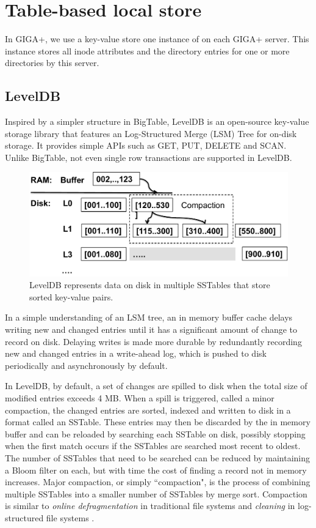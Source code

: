 \section{Table-based local store}
In GIGA+, we use a key-value store 
one instance of \ldb \cite{LevelDB} on each GIGA+ server.
This \ldb instance stores all inode attributes and the directory entries 
for one or more directories by this server.

\subsection{LevelDB}
Inspired by a simpler structure in BigTable\cite{BigTable}, LevelDB \cite{LevelDB} is an open-source key-value storage library
that features an Log-Structured Merge (LSM) Tree \cite{ONeil1996} for on-disk storage.
It provides simple APIs such as GET, PUT, DELETE and SCAN.
Unlike BigTable, not even single row transactions are supported in LevelDB. 

\begin{figure}[!ht]
\centering
\includegraphics[scale=0.4]{figs/leveldb}
\caption{LevelDB represents data on disk in multiple SSTables that store sorted key-value pairs.}
\label{fig:leveldb}
\end{figure}

In a simple understanding of an LSM tree, an in memory buffer cache delays writing new and changed entries until it has a significant amount of change to record on disk. Delaying writes is made more durable by redundantly recording new and changed entries in a write-ahead log, which is pushed to disk periodically and asynchronously by default.

In LevelDB, by default, a set of changes are spilled to disk when the total size of modified entries exceeds 4 MB.  When a spill is triggered, called a minor compaction, the changed entries are sorted, indexed and written to disk in a format called an SSTable\cite{BigTable}.  These entries may then be discarded by the in memory buffer and can be reloaded by searching each SSTable on disk, possibly stopping when the first match occurs if the SSTables are searched most recent to oldest.  The number of SSTables that need to be searched can be reduced by maintaining a Bloom filter\cite{bloomfilter} on each, but with time the cost of finding a record not in memory increases.  Major compaction, or simply ``compaction", is the process of combining multiple SSTables into a smaller number of SSTables by merge sort. Compaction is similar to \emph{online defragmentation} in traditional file systems and \emph{cleaning} in log-structured file systems \cite{LFS}.

